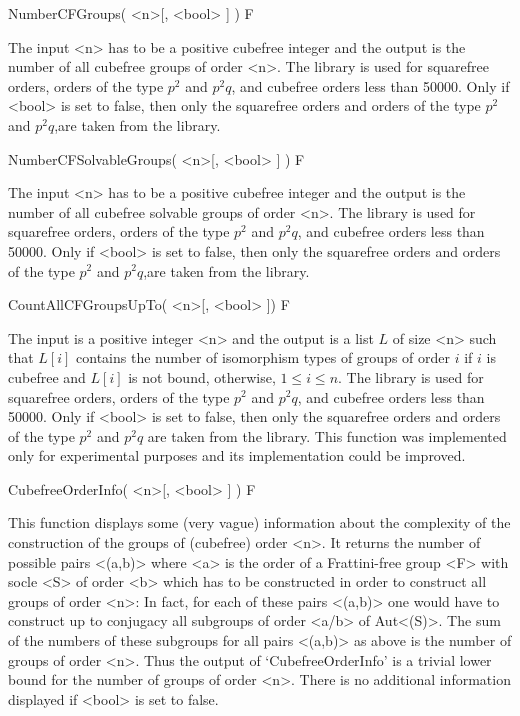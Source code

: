 \>NumberCFGroups( <n>[, <bool> ] ) F

The input <n> has to be a positive cubefree integer and the output is the number of all
cubefree groups of order <n>. The {\SmallGroups} library  is used for squarefree
orders, orders of the type $p^2$ and $p^2q$, and cubefree orders less than
50000. Only if <bool> is set to false, then only  the squarefree
orders and orders of the type $p^2$ and $p^2q$,are taken from the {\SmallGroups}  library.


\>NumberCFSolvableGroups( <n>[, <bool> ] ) F 

The input <n> has to be a positive cubefree integer and the output is the number of all
cubefree solvable groups of order <n>. The {\SmallGroups} library  is used for squarefree
orders, orders of the type $p^2$ and $p^2q$, and cubefree orders less than
50000. Only if <bool> is set to false, then only  the squarefree
orders and orders of the type $p^2$ and $p^2q$,are taken from the {\SmallGroups} library.


\>CountAllCFGroupsUpTo( <n>[, <bool> ]) F  

The input is a positive integer <n> and the output is a list $L$ of size <n> such that
$L[i]$ contains the number of isomorphism types of groups of order $i$ if $i$
is cubefree and $L[i]$ is not bound, otherwise, $1\leq i \leq n$. The
{\SmallGroups} library  is used for squarefree orders, orders of the type $p^2$ and $p^2q$, and cubefree orders less than
50000. Only if <bool> is set to false, then only  the squarefree
orders and orders of the type $p^2$ and $p^2q$ are taken from the
{\SmallGroups} library. This function was implemented only for experimental
purposes and its implementation could be improved.


\>CubefreeOrderInfo( <n>[, <bool> ] ) F

This function displays some (very vague)
information about the complexity of the construction of the groups of
(cubefree) order <n>. It returns the number of possible pairs <(a,b)> where
<a> is the order of a Frattini-free group <F> with socle <S> of order <b> which
has to be constructed in order to construct all groups of order <n>: In fact,
for each of these pairs <(a,b)> one would have to construct up to conjugacy all
subgroups of order <a/b> of Aut<(S)>. The sum of the numbers of these
subgroups for all pairs  <(a,b)> as above is the number of groups of order
<n>. Thus the output of `CubefreeOrderInfo' is a trivial lower bound for the number of
groups of order <n>. There is no additional information
displayed if <bool> is set to false.


